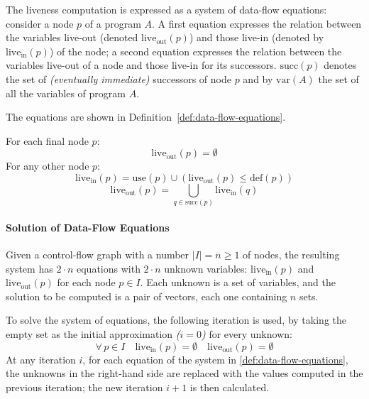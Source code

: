 \documentclass[english]{article}
\begin{document}
The liveness computation is expressed as a system of data-flow equations:
consider a node \(p\) of a program \(A\).
A first equation expresses the relation between the variables live-out (denoted \(\text{live}_\text{out}\left( p \right)\)) and those live-in (denoted by \(\text{live}_\text{in}\left( p \right)\)) of the node;
a second equation expresses the relation between the variables live-out of a node and those live-in for its successors.
\(\text{succ}\left( p \right)\) denotes the set of \textit{(eventually immediate)} successors of node \(p\) and by \(\text{var}(A)\) the set of all the variables of program \(A\).

The equations are shown in Definition~\ref{def:data-flow-equations}.

\begin{definition}
  \label{def:data-flow-equations}
  For each final node \(p\):
  \[ \text{live}_\text{out}\left( p \right) = \emptyset \]
  For any other node \(p\):
  \[ \text{live}_\text{in}\left( p \right) = \text{use}\left( p \right) \cup \left( \text{live}_\text{out} \left( p \right) \leq \text{def}\left( p \right) \right) \]
  \[ \text{live}_\text{out}\left( p \right) = \bigcup_{q \in \text{succ}\left( p \right)} \text{live}_\text{in}\left( q \right) \]
\end{definition}

\paragraph{Solution of Data-Flow Equations}

Given a control-flow graph with a number \(|I| = n \geq 1\) of nodes, the resulting system has \(2 \cdot n\) equations with \(2 \cdot n\) unknown variables: \(\text{live}_\text{in}\left( p \right)\) and \(\text{live}_\text{out}\left( p \right)\) for each node \(p \in I\).
Each unknown is a set of variables, and the solution to be computed is a pair of vectors, each one containing \(n\) sets.

To solve the system of equations, the following iteration is used, by taking the empty set as the initial approximation \textit{(\(i=0\))} for every unknown:
\[ \forall \, p \in I \quad \text{live}_\text{in}\left( p \right) = \emptyset \quad \text{live}_\text{out} \left( p \right) = \emptyset \]
At any iteration \(i\), for each equation of the system in \ref{def:data-flow-equations}, the unknowns in the right-hand side are replaced with the values computed in the previous iteration;
the new iteration \(i + 1\) is then calculated.
\end{document}
